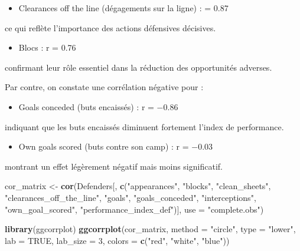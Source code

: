 \documentclass[
  6pt,
]{article}
\newenvironment{Shaded}{\begin{snugshade}}{\end{snugshade}}
\newcommand{\AttributeTok}[1]{\textcolor[rgb]{0.13,0.29,0.53}{#1}}
\newcommand{\ConstantTok}[1]{\textcolor[rgb]{0.56,0.35,0.01}{#1}}
\newcommand{\DecValTok}[1]{\textcolor[rgb]{0.00,0.00,0.81}{#1}}
\newcommand{\FunctionTok}[1]{\textcolor[rgb]{0.13,0.29,0.53}{\textbf{#1}}}
\newcommand{\NormalTok}[1]{#1}
\newcommand{\OtherTok}[1]{\textcolor[rgb]{0.56,0.35,0.01}{#1}}
\newcommand{\StringTok}[1]{\textcolor[rgb]{0.31,0.60,0.02}{#1}}
\providecommand{\tightlist}{%
  \setlength{\itemsep}{0pt}\setlength{\parskip}{0pt}}
\begin{document}
\begin{itemize}
\tightlist
\item
  Clearances off the line (dégagements sur la ligne) : = 0.87
\end{itemize}

ce qui reflète l'importance des actions défensives décisives.

\begin{itemize}
\tightlist
\item
  Blocs : r = 0.76
\end{itemize}

confirmant leur rôle essentiel dans la réduction des opportunités
adverses.

Par contre, on constate une corrélation négative pour :

\begin{itemize}
\tightlist
\item
  Goals conceded (buts encaissés) : r = −0.86
\end{itemize}

indiquant que les buts encaissés diminuent fortement l'index de
performance.

\begin{itemize}
\tightlist
\item
  Own goals scored (buts contre son camp) : r = −0.03
\end{itemize}

montrant un effet légèrement négatif mais moins significatif.

\begin{Shaded}
\begin{Highlighting}[]
\NormalTok{cor\_matrix }\OtherTok{\textless{}{-}} \FunctionTok{cor}\NormalTok{(Defenders[, }\FunctionTok{c}\NormalTok{(}\StringTok{"appearances"}\NormalTok{, }\StringTok{"blocks"}\NormalTok{, }\StringTok{"clean\_sheets"}\NormalTok{, }\StringTok{"clearances\_off\_the\_line"}\NormalTok{, }\StringTok{"goals"}\NormalTok{, }
                                \StringTok{"goals\_conceded"}\NormalTok{, }\StringTok{"interceptions"}\NormalTok{, }\StringTok{"own\_goal\_scored"}\NormalTok{, }\StringTok{"performance\_index\_def"}\NormalTok{)], }
                  \AttributeTok{use =} \StringTok{"complete.obs"}\NormalTok{)}

\FunctionTok{library}\NormalTok{(ggcorrplot)}
\FunctionTok{ggcorrplot}\NormalTok{(cor\_matrix, }\AttributeTok{method =} \StringTok{"circle"}\NormalTok{, }\AttributeTok{type =} \StringTok{"lower"}\NormalTok{, }\AttributeTok{lab =} \ConstantTok{TRUE}\NormalTok{, }\AttributeTok{lab\_size =} \DecValTok{3}\NormalTok{, }\AttributeTok{colors =} \FunctionTok{c}\NormalTok{(}\StringTok{"red"}\NormalTok{, }\StringTok{"white"}\NormalTok{, }\StringTok{"blue"}\NormalTok{))}
\end{Highlighting}
\end{Shaded}
\end{document}
